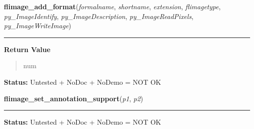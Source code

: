 \hspace{.8\funcindent}\begin{boxedminipage}{\funcwidth}

    \raggedright \textbf{flimage\_add\_format}(\textit{formalname}, \textit{shortname}, \textit{extension}, \textit{flimagetype}, \textit{py\_ImageIdentify}, \textit{py\_ImageDescription}, \textit{py\_ImageReadPixels}, \textit{py\_ImageWriteImage})

    \vspace{-1.5ex}

    \rule{\textwidth}{0.5\fboxrule}
\setlength{\parskip}{2ex}
\setlength{\parskip}{1ex}
      \textbf{Return Value}
    \vspace{-1ex}

      \begin{quote}
      num

      \end{quote}

\textbf{Status:} Untested + NoDoc + NoDemo = NOT OK



    \end{boxedminipage}

    \label{xformslib:library:flimage_set_annotation_support}

    \vspace{0.5ex}

\hspace{.8\funcindent}\begin{boxedminipage}{\funcwidth}

    \raggedright \textbf{flimage\_set\_annotation\_support}(\textit{p1}, \textit{p2})

    \vspace{-1.5ex}

    \rule{\textwidth}{0.5\fboxrule}
\setlength{\parskip}{2ex}
\setlength{\parskip}{1ex}
\textbf{Status:} Untested + NoDoc + NoDemo = NOT OK



    \end{boxedminipage}

    \label{xformslib:library:flimage_getcolormap}

    \vspace{0.5ex}

